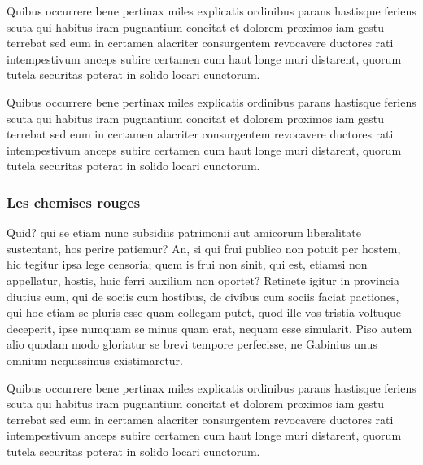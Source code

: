 \documentclass{framatexclass}
\begin{document}

\begin{leftbarencart}

Quibus occurrere bene pertinax miles explicatis ordinibus parans hastisque feriens scuta qui habitus iram pugnantium concitat et dolorem proximos iam gestu terrebat sed eum in certamen alacriter consurgentem revocavere ductores rati intempestivum anceps subire certamen cum haut longe muri distarent, quorum tutela securitas poterat in solido locari cunctorum.
\end{leftbarencart}


Quibus occurrere bene pertinax miles explicatis ordinibus parans hastisque feriens scuta qui habitus iram pugnantium concitat et dolorem proximos iam gestu terrebat sed eum in certamen alacriter consurgentem revocavere ductores rati intempestivum anceps subire certamen cum haut longe muri distarent, quorum tutela securitas poterat in solido locari cunctorum.


\subsubsection{Les chemises rouges}
Quid? qui se etiam nunc subsidiis patrimonii aut amicorum liberalitate sustentant, hos perire patiemur? An, si qui frui publico non potuit per hostem, hic tegitur ipsa lege censoria; quem is frui non sinit, qui est, etiamsi non appellatur, hostis, huic ferri auxilium non oportet? Retinete igitur in provincia diutius eum, qui de sociis cum hostibus, de civibus cum sociis faciat pactiones, qui hoc etiam se pluris esse quam collegam putet, quod ille vos tristia voltuque deceperit, ipse numquam se minus quam erat, nequam esse simularit. Piso autem alio quodam modo gloriatur se brevi tempore perfecisse, ne Gabinius unus omnium nequissimus existimaretur.


\begin{encart}
Quibus occurrere bene pertinax miles explicatis ordinibus parans hastisque feriens scuta qui habitus iram pugnantium concitat et dolorem proximos iam gestu terrebat sed eum in certamen alacriter consurgentem revocavere ductores rati intempestivum anceps subire certamen cum haut longe muri distarent, quorum tutela securitas poterat in solido locari cunctorum.
\end{encart}
\end{document}
